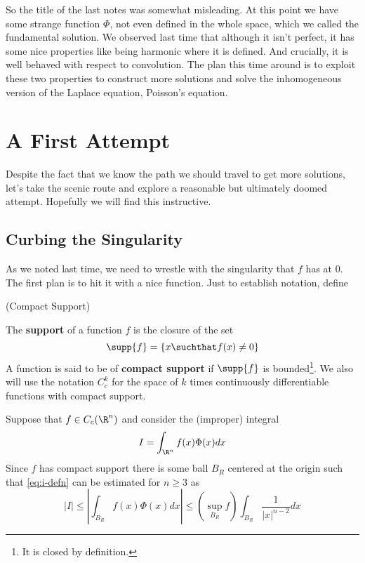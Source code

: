 \documentclass{bkcnotes}
\begin{document}
\maketitle

So the title of the last notes was somewhat misleading. At this point
we have some strange function $\Phi$, not even defined in the whole
space, which we called the fundamental solution. We observed last time
that although it isn't perfect, it has some nice properties like being
harmonic where it is defined. And crucially, it is well behaved with
respect to convolution. The plan this time around is to exploit these
two properties to construct more solutions and solve the inhomogeneous
version of the Laplace equation, Poisson's equation.

\section{A First Attempt}
Despite the fact that we know the path we should travel to get more
solutions, let's take the scenic route and explore a reasonable but
ultimately doomed attempt. Hopefully we will find this instructive.

\subsection{Curbing the Singularity}
As we noted last time, we need to wrestle with the singularity that
$f$ has at 0. The first plan is to hit it with a nice function. Just
to establish notation, define
\begin{ndefn}(Compact Support)

  The \textbf{support} of a function $f$ is the closure of the set
  \begin{equation}
    \label{eq:support}
    \supp{f} = \{x \suchthat f(x) \neq 0\}
  \end{equation}
  A function is said to be of \textbf{compact support} if $\supp{f}$
  is bounded\footnote{It is closed by definition.}. We also will use
  the notation $C^k_c$ for the space of $k$ times continuously
  differentiable functions with compact support.
\end{ndefn}
Suppose that $f \in C_c(\R^n)$ and consider the (improper) integral
\begin{equation}
  \label{eq:i-defn}
  I = \int_{\R^n} f(x)\Phi(x)dx
\end{equation}
Since $f$ has compact support there is some ball $B_R$ centered at the
origin such that \eqref{eq:i-defn} can be estimated for $n \geq 3$ as
\begin{equation}
  \label{eq:i-estimate}
  |I| \leq \left| \int_{B_R}f(x)\Phi(x)dx\right|
  \leq (\sup_{B_R} f)\int_{B_R}\frac{1}{|x|^{n-2}}dx
\end{equation}
\end{document}
